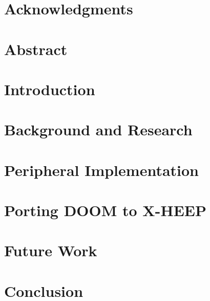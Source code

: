 \documentclass[11pt,twoside]{report}
\begin{document}



\chapter*{Acknowledgments}


\chapter*{Abstract}


\tableofcontents

\chapter{Introduction}


\chapter{Background and Research}



\chapter{Peripheral Implementation}
 

\chapter{Porting DOOM to X-HEEP}


\chapter{Future Work}


\chapter{Conclusion}


\printbibliography
\end{document}
